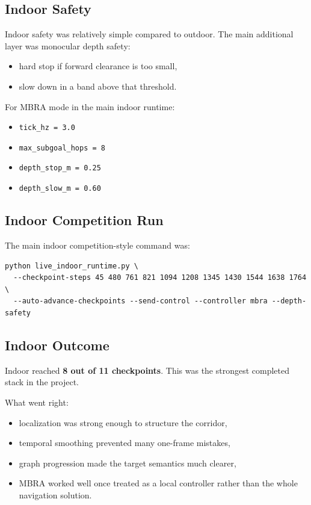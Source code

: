 \documentclass[11pt]{article}
\begin{document}
\subsection{Indoor Safety}

Indoor safety was relatively simple compared to outdoor. The main additional layer
was monocular depth safety:

\begin{itemize}[nosep]
  \item hard stop if forward clearance is too small,
  \item slow down in a band above that threshold.
\end{itemize}

For MBRA mode in the main indoor runtime:

\begin{itemize}[nosep]
  \item \texttt{tick\_hz = 3.0}
  \item \texttt{max\_subgoal\_hops = 8}
  \item \texttt{depth\_stop\_m = 0.25}
  \item \texttt{depth\_slow\_m = 0.60}
\end{itemize}

\subsection{Indoor Competition Run}

The main indoor competition-style command was:

\begin{verbatim}
python live_indoor_runtime.py \
  --checkpoint-steps 45 480 761 821 1094 1208 1345 1430 1544 1638 1764 \
  --auto-advance-checkpoints --send-control --controller mbra --depth-safety
\end{verbatim}

\subsection{Indoor Outcome}

Indoor reached \textbf{8 out of 11 checkpoints}. This was the strongest completed
stack in the project.

What went right:

\begin{itemize}[nosep]
  \item localization was strong enough to structure the corridor,
  \item temporal smoothing prevented many one-frame mistakes,
  \item graph progression made the target semantics much clearer,
  \item MBRA worked well once treated as a local controller rather than the whole
  navigation solution.
\end{itemize}
\end{document}
